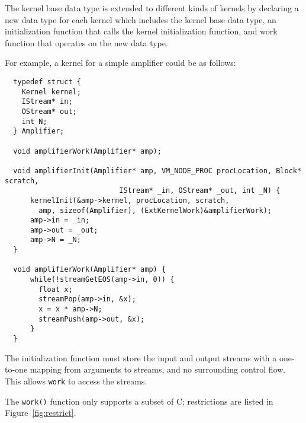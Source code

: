 The kernel base data type is extended to different kinds of 
kernels by declaring a new data type for each kernel 
which includes the kernel base data type,
an initialization function that calls the kernel 
initialization function, and work function that 
operates on the new data type. 

For example, a kernel for a simple amplifier could be as follows:

{\small
\begin{verbatim}
  typedef struct {
    Kernel kernel;
    IStream* in;
    OStream* out;
    int N;
  } Amplifier;

  void amplifierWork(Amplifier* amp);

  void amplifierInit(Amplifier* amp, VM_NODE_PROC procLocation, Block* scratch, 
                           IStream* _in, OStream* _out, int _N) {
      kernelInit(&amp->kernel, procLocation, scratch, 
        amp, sizeof(Amplifier), (ExtKernelWork)&amplifierWork);
      amp->in = _in;
      amp->out = _out;
      amp->N = _N;
  }

  void amplifierWork(Amplifier* amp) {
      while(!streamGetEOS(amp->in, 0)) {
        float x;
        streamPop(amp->in, &x);
        x = x * amp->N;
        streamPush(amp->out, &x);
      }
  }
\end{verbatim}}


The initialization function must store the input and output streams with a one-to-one mapping from arguments to streams, and no surrounding control flow.  This allows {\tt work} to access the streams.

The {\tt work()} function only supports a subset of C; restrictions are listed in Figure~\ref{fig:restrict}.  

